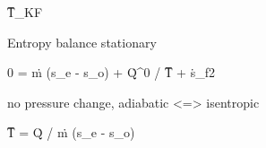 T̅_KF

Entropy balance stationary

0 = ṁ (s_e - s_o) + Q̇^0 / T̅ + ṡ_f2

no pressure change, adiabatic <=> isentropic

T̅ = Q̇ / ṁ (s_e - s_o)